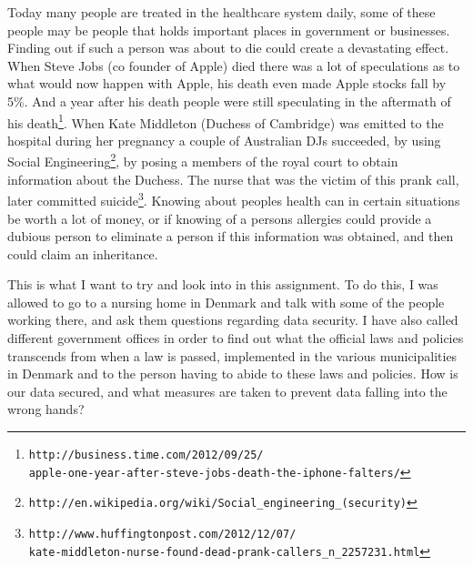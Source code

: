 \documentclass[11pt]{article}
\begin{document}
Today many people are treated in the healthcare system daily, some of these people may be people that holds important places in government or businesses. Finding out if such a person was about to die could create a devastating effect. When Steve Jobs (co founder of Apple) died there was a lot of speculations as to what would now happen with Apple, his death even made Apple stocks fall by 5\%. And a year after his death people were still speculating in the aftermath of his death\footnote{ \texttt{http://business.time.com/2012/09/25/ \\
apple-one-year-after-steve-jobs-death-the-iphone-falters/} }. When Kate Middleton (Duchess of Cambridge) was emitted to the hospital during her pregnancy a couple of Australian DJs succeeded, by using Social Engineering\footnote{ \texttt{http://en.wikipedia.org/wiki/Social\_engineering\_(security)} }, by posing a members of the royal court to obtain information about the Duchess. The nurse that was the victim of this prank call, later committed suicide\footnote{ \texttt{http://www.huffingtonpost.com/2012/12/07/\\kate-middleton-nurse-found-dead-prank-callers\_n\_2257231.html} }. Knowing about peoples health can in certain situations be worth a lot of money, or if knowing of a persons allergies could provide a dubious person to eliminate a person if this information was obtained, and then could claim an inheritance.

 This is what I want to try and look into in this assignment. To do this, I was allowed to go to a nursing home in Denmark and talk with some of the people working there, and ask them questions regarding data security. I have also called different government offices in order to find out what the official laws and policies transcends from when a law is passed, implemented in the various municipalities in Denmark and to the person having to abide to these laws and policies. How is our data secured, and what measures are taken to prevent data falling into the wrong hands?  
\end{document}
